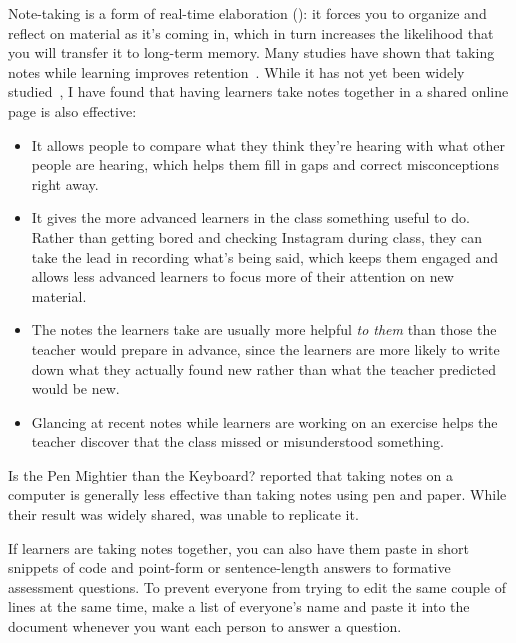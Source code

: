 
Note-taking is a form of real-time elaboration ():
it forces you to organize and reflect on material as it's coming in,
which in turn increases the likelihood that you will transfer it to long-term memory.
Many studies have shown that
taking notes while learning improves retention~\cite{Aike1975,Boha2011}.
While it has not yet been widely studied~\cite{Ornd2015,Yang2015},
I have found that having learners take notes together in a shared online page is also effective:

\begin{itemize}

\item
  It allows people to compare what they think they're hearing
  with what other people are hearing,
  which helps them fill in gaps and correct misconceptions right away.

\item
  It gives the more advanced learners in the class something useful to do.
  Rather than getting bored and checking Instagram during class,
  they can take the lead in recording what's being said,
  which keeps them engaged
  and allows less advanced learners to focus more of their attention on new material.

\item
  The notes the learners take are usually more helpful \emph{to them}
  than those the teacher would prepare in advance,
  since the learners are more likely to write down what they actually found new
  rather than what the teacher predicted would be new.

\item
  Glancing at recent notes while learners are working on an exercise
  helps the teacher discover that the class missed or misunderstood something.

\end{itemize}

\begin{aside}{Is the Pen Mightier than the Keyboard?}
  \cite{Muel2014} reported that taking notes on a computer
  is generally less effective than taking notes using pen and paper.
  While their result was widely shared,
  \cite{More2019} was unable to replicate it.
\end{aside}

If learners are taking notes together,
you can also have them paste in short snippets of code
and point-form or sentence-length answers to formative assessment questions.
To prevent everyone from trying to edit the same couple of lines at the same time,
make a list of everyone's name and paste it into the document
whenever you want each person to answer a question.

